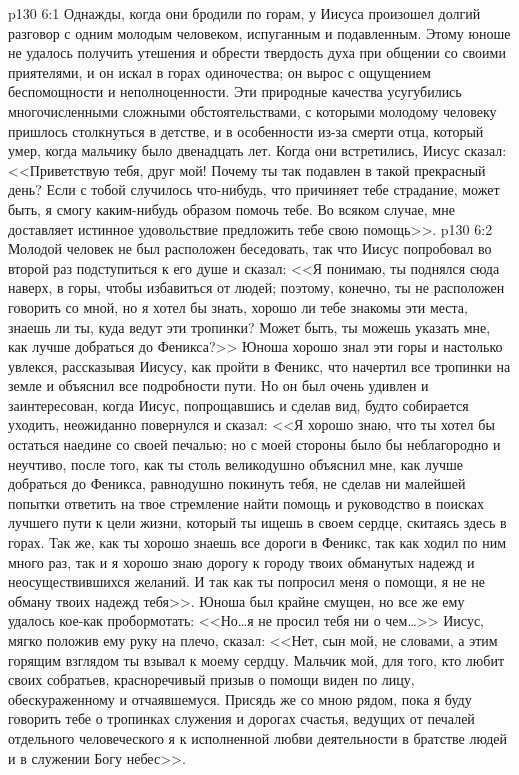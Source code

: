 \vs p130 6:1 Однажды, когда они бродили по горам, у Иисуса произошел долгий разговор с одним молодым человеком, испуганным и подавленным. Этому юноше не удалось получить утешения и обрести твердость духа при общении со своими приятелями, и он искал в горах одиночества; он вырос с ощущением беспомощности и неполноценности. Эти природные качества усугубились многочисленными сложными обстоятельствами, с которыми молодому человеку пришлось столкнуться в детстве, и в особенности из\hyp{}за смерти отца, который умер, когда мальчику было двенадцать лет. Когда они встретились, Иисус сказал: <<Приветствую тебя, друг мой! Почему ты так подавлен в такой прекрасный день? Если с тобой случилось что\hyp{}нибудь, что причиняет тебе страдание, может быть, я смогу каким\hyp{}нибудь образом помочь тебе. Во всяком случае, мне доставляет истинное удовольствие предложить тебе свою помощь>>.
\vs p130 6:2 Молодой человек не был расположен беседовать, так что Иисус попробовал во второй раз подступиться к его душе и сказал: <<Я понимаю, ты поднялся сюда наверх, в горы, чтобы избавиться от людей; поэтому, конечно, ты не расположен говорить со мной, но я хотел бы знать, хорошо ли тебе знакомы эти места, знаешь ли ты, куда ведут эти тропинки? Может быть, ты можешь указать мне, как лучше добраться до Феникса?>> Юноша хорошо знал эти горы и настолько увлекся, рассказывая Иисусу, как пройти в Феникс, что начертил все тропинки на земле и объяснил все подробности пути. Но он был очень удивлен и заинтересован, когда Иисус, попрощавшись и сделав вид, будто собирается уходить, неожиданно повернулся и сказал: <<Я хорошо знаю, что ты хотел бы остаться наедине со своей печалью; но с моей стороны было бы неблагородно и неучтиво, после того, как ты столь великодушно объяснил мне, как лучше добраться до Феникса, равнодушно покинуть тебя, не сделав ни малейшей попытки ответить на твое стремление найти помощь и руководство в поисках лучшего пути к цели жизни, который ты ищешь в своем сердце, скитаясь здесь в горах. Так же, как ты хорошо знаешь все дороги в Феникс, так как ходил по ним много раз, так и я хорошо знаю дорогу к городу твоих обманутых надежд и неосуществившихся желаний. И так как ты попросил меня о помощи, я не не обману твоих надежд тебя>>. Юноша был крайне смущен, но все же ему удалось кое\hyp{}как пробормотать: <<Но\ldots  я не просил тебя ни о чем\ldots >> Иисус, мягко положив ему руку на плечо, сказал: <<Нет, сын мой, не словами, а этим горящим взглядом ты взывал к моему сердцу. Мальчик мой, для того, кто любит своих собратьев, красноречивый призыв о помощи виден по лицу, обескураженному и отчаявшемуся. Присядь же со мною рядом, пока я буду говорить тебе о тропинках служения и дорогах счастья, ведущих от печалей отдельного человеческого я к исполненной любви деятельности в братстве людей и в служении Богу небес>>.
